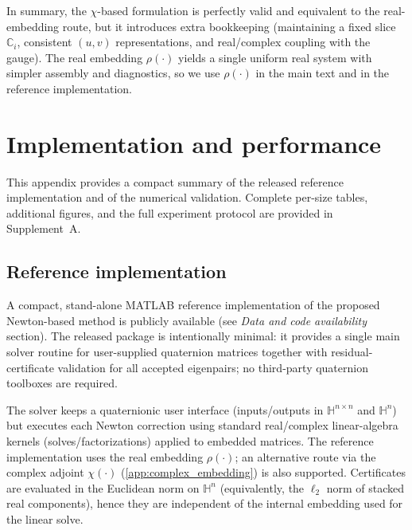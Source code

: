 \documentclass[preprint,12pt]{elsarticle}  %
\theoremstyle{definition}
\theoremstyle{definition}
\theoremstyle{definition}
\theoremstyle{definition}
\theoremstyle{definition}
\theoremstyle{remark}
\theoremstyle{remark}
\theoremstyle{remark}
\DeclareRobustCommand{\i}{\ensuremath{\mathbf{i}}}
\DeclareRobustCommand{\j}{\ensuremath{\mathbf{j}}}
\DeclareRobustCommand{\k}{\ensuremath{\mathbf{k}}}
\def\i{i}\def\j{j}\def\k{k}%
\newcommand{\CC}{\mathbb{C}}
\newcommand{\HH}{\mathbb{H}}
\begin{document}
In summary, the $\chi$-based formulation is perfectly valid and equivalent to the real-embedding route, but it introduces extra bookkeeping (maintaining a fixed slice $\CC_\i$, consistent $(u,v)$ representations, and real/complex coupling with the gauge). The real embedding $\rho(\cdot)$ yields a single uniform real system with simpler assembly and diagnostics, so we use
$\rho(\cdot)$ in the main text and in the reference implementation.

\section{Implementation and performance}
\label{app:implementation}
This appendix provides a compact summary of the released reference implementation and of the numerical validation.
Complete per-size tables, additional figures, and the full experiment protocol are provided in Supplement~A.

\subsection{Reference implementation}
\label{appB:ref_impl}
A compact, stand-alone MATLAB reference implementation of the proposed Newton-based method is publicly available
\linebreak[2]
(see \emph{Data and code availability} section).
The released package is intentionally minimal: it provides a single main solver routine for user-supplied quaternion matrices together with residual-certificate validation for all accepted eigenpairs; no third-party quaternion toolboxes are required.

The solver keeps a quaternionic user interface (inputs/outputs in $\HH^{n\times n}$ and $\HH^{n}$) but executes each Newton correction using standard real/complex linear-algebra kernels (solves/factorizations) applied to embedded matrices. The reference implementation uses the real embedding $\rho(\cdot)$; an alternative route via the complex adjoint $\chi(\cdot)$
(\ref{app:complex_embedding}) is also supported. Certificates are evaluated in the Euclidean norm on $\HH^n$ (equivalently, the $\ell_2$ norm of stacked real components), hence they are independent of the internal embedding used for the
linear solve.
\end{document}
